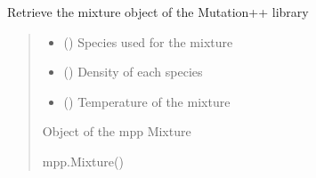 \documentclass[letterpaper,10pt,english]{sphinxmanual}
\begin{document}
\begin{fulllineitems}
\label{\detokenize{modules:mix_mpp.mixture_mpp}}
\pysigstartsignatures
{}
\pysigstopsignatures
\sphinxAtStartPar
Retrieve the mixture object of the Mutation++ library
\begin{quote}\begin{description}
\begin{itemize}
\item {} 
\sphinxAtStartPar
{} () \textendash{} Species used for the mixture

\item {} 
\sphinxAtStartPar
{} () \textendash{} Density of each species

\item {} 
\sphinxAtStartPar
{} () \textendash{} Temperature of the mixture

\end{itemize}

\sphinxAtStartPar
{} \textendash{} Object of the mpp Mixture

\sphinxAtStartPar
mpp.Mixture()

\end{description}\end{quote}

\end{fulllineitems}

\end{document}
